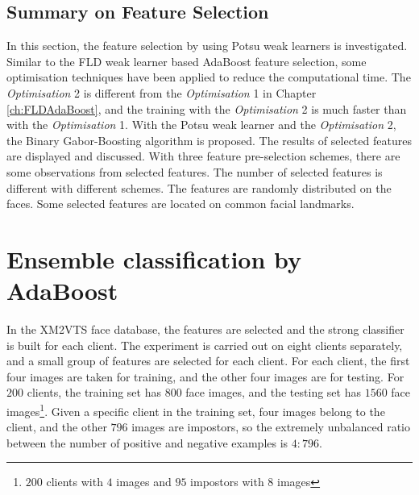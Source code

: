 \subsection{Summary on Feature Selection}
In this section, the feature selection by using Potsu weak learners is investigated. Similar to the FLD weak learner based AdaBoost feature selection, some optimisation techniques have been applied to reduce the computational time. The \textit{Optimisation} 2 is different from the \textit{Optimisation} 1 in \mbox{Chapter} \ref{ch:FLDAdaBoost}, and the training with the \textit{Optimisation} 2 is much faster than with the \textit{Optimisation} 1. With the Potsu weak learner and the \textit{Optimisation} 2, the Binary Gabor-Boosting algorithm is proposed. The results of selected features are displayed and discussed. With three feature pre-selection schemes, there are some observations from selected features. The number of selected features is different with different schemes. The features are randomly distributed on the faces. Some selected features are located on common facial landmarks.



\section{Ensemble classification by AdaBoost}
\label{sec:adaboostclassification}
In the \mbox{XM2VTS} face database, the features are selected and the strong classifier is built for each client. The experiment is carried out on eight clients separately, and a small group of features are selected for each client. For each client, the first four images are taken for training, and the other four images are for testing. For $200$ clients, the training set has $800$ face images, and the testing set has $1560$ face images\footnote{$200$ clients with $4$ images and $95$ impostors with $8$ images}. Given a specific client in the training set, four images belong to the client, and the other $796$ images are impostors, so the extremely unbalanced ratio between the number of positive and negative examples is $4:796$.


